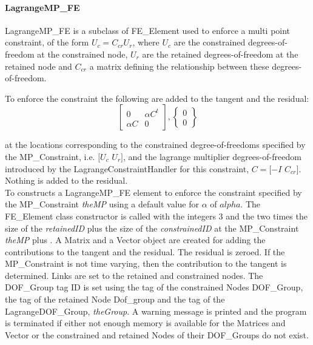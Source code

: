 \paragraph{LagrangeMP\_FE}
LagrangeMP\_FE is a subclass of FE\_Element used to enforce a
multi point constraint, of the form $U_c = C_{cr} U_r$, where $U_c$ are
the constrained degrees-of-freedom at the constrained node, $U_r$ are
the retained degrees-of-freedom at the retained node and $C_{cr}$ a
matrix defining the relationship between these degrees-of-freedom. 

To enforce the constraint the following are added to the tangent and
the residual:
\[ \left[ \begin{array}{cc} 0 & \alpha C^t \\ \alpha C & 0 \end{array}
\right] ,
\left\{ \begin{array}{c} 0 \\ 0 \end{array} \right\} \]

\noindent at the locations
corresponding to the constrained degree-of-freedoms specified by the
MP\_Constraint, i.e. $[U_c$ $U_r]$, and the lagrange multiplier
degrees-of-freedom introduced by the LagrangeConstraintHandler for
this constraint, $C = [-I$ $ C_{cr}]$. Nothing is added to the residual. \\  


To constructs a LagrangeMP\_FE element to enforce the constraint
specified by the MP\_Constraint {\em theMP} using a default value for
$\alpha$ of $alpha$. The FE\_Element class constructor is called with
the integers $3$ and the two times the size of the {\em retainedID}
plus the size of the {\em constrainedID} at the MP\_Constraint {\em
theMP} plus . A Matrix and a Vector object are created for adding the
contributions to the tangent and the residual. The residual is
zeroed. If the MP\_Constraint is not time varying, then the contribution to the
tangent is determined. Links are set to the retained and constrained
nodes. The DOF\_Group tag ID is set using the tag of the constrained
Nodes DOF\_Group, the tag of the retained Node Dof\_group and the tag
of the LagrangeDOF\_Group, {\em theGroup}. A warning message is printed and 
the program is terminated if either not enough memory is available for
the Matrices and Vector or the constrained and retained Nodes of their
DOF\_Groups do not exist. \\




